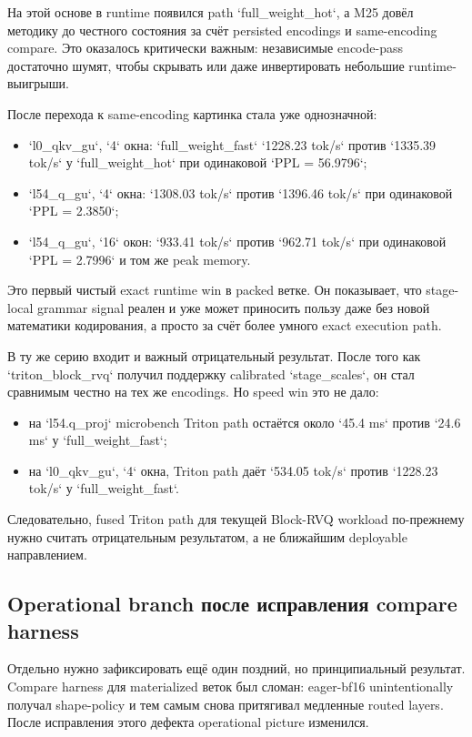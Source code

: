На этой основе в runtime появился path `full_weight_hot`, а M25 довёл методику
до честного состояния за счёт persisted encodings и same-encoding compare. Это
оказалось критически важным: независимые encode-pass достаточно шумят, чтобы
скрывать или даже инвертировать небольшие runtime-выигрыши.

После перехода к same-encoding картинка стала уже однозначной:

\begin{itemize}[leftmargin=1.5em]
\item `l0_qkv_gu`, `4` окна: `full_weight_fast` `1228.23 tok/s` против
`1335.39 tok/s` у `full_weight_hot` при одинаковой `PPL = 56.9796`;
\item `l54_q_gu`, `4` окна: `1308.03 tok/s` против `1396.46 tok/s` при
одинаковой `PPL = 2.3850`;
\item `l54_q_gu`, `16` окон: `933.41 tok/s` против `962.71 tok/s` при
одинаковой `PPL = 2.7996` и том же peak memory.
\end{itemize}

Это первый чистый exact runtime win в packed ветке. Он показывает, что
stage-local grammar signal реален и уже может приносить пользу даже без новой
математики кодирования, а просто за счёт более умного exact execution path.

В ту же серию входит и важный отрицательный результат. После того как
`triton_block_rvq` получил поддержку calibrated `stage_scales`, он стал
сравнимым честно на тех же encodings. Но speed win это не дало:

\begin{itemize}[leftmargin=1.5em]
\item на `l54.q_proj` microbench Triton path остаётся около `45.4 ms` против
`24.6 ms` у `full_weight_fast`;
\item на `l0_qkv_gu`, `4` окна, Triton path даёт `534.05 tok/s` против
`1228.23 tok/s` у `full_weight_fast`.
\end{itemize}

Следовательно, fused Triton path для текущей Block-RVQ workload по-прежнему
нужно считать отрицательным результатом, а не ближайшим deployable направлением.

\subsection{Operational branch после исправления compare harness}

Отдельно нужно зафиксировать ещё один поздний, но принципиальный результат.
Compare harness для materialized веток был сломан: eager-bf16 unintentionally
получал shape-policy и тем самым снова притягивал медленные routed layers.
После исправления этого дефекта operational picture изменился.

